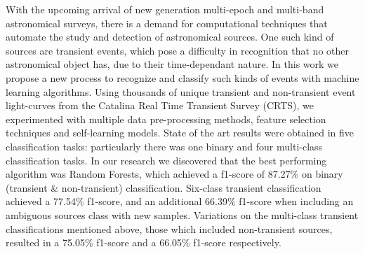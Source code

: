 

With the upcoming arrival of new generation multi-epoch and multi-band astronomical surveys, there is a demand for computational techniques that automate the study and detection of astronomical sources. One such kind of sources are transient events, which pose a difficulty in recognition that no other astronomical object has, due to their time-dependant nature. In this work we propose a new process to recognize and classify such kinds of events with machine learning algorithms. Using thousands of unique transient and non-transient event light-curves from the Catalina Real Time Transient Survey (CRTS), we experimented  with multiple data pre-processing methods, feature selection techniques and self-learning models. State of the art results were obtained in five classification tasks: particularly there was one binary and four multi-class classification tasks. In our research we discovered that the best performing algorithm was Random Forests, which achieved a f1-score of 87.27\% on binary (transient \& non-transient) classification. Six-class transient classification achieved a 77.54\% f1-score, and an additional 66.39\% f1-score when including an ambiguous sources class with new samples. Variations on the multi-class transient classifications mentioned above, those which included non-transient sources, resulted in a 75.05\% f1-score and a 66.05\% f1-score respectively. 